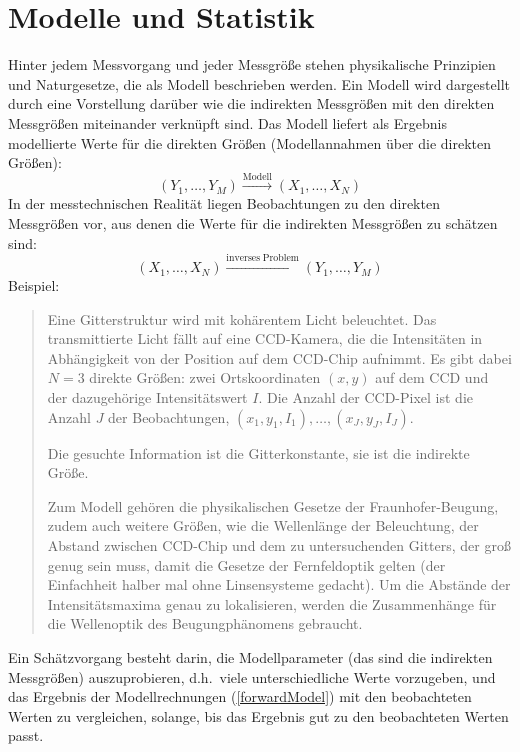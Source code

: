 \documentclass[a4paper,12pt,DIV=15]{scrartcl}
\begin{document}
\section{Modelle und Statistik}
Hinter jedem Messvorgang und jeder Messgröße stehen physikalische Prinzipien und Naturgesetze, die
als Modell beschrieben werden. Ein Modell wird dargestellt durch eine Vorstellung darüber wie die
indirekten Messgrößen mit den direkten Messgrößen miteinander verknüpft sind.
Das Modell liefert als Ergebnis modellierte Werte für die direkten Größen (Modellannahmen über die direkten Größen):
\begin{equation}
(Y_1, \dots, Y_M) \xrightarrow{\mathrm{Modell}} (X_1, \dots, X_N)
\label{forwardModel}
\end{equation}
In der messtechnischen Realität liegen Beobachtungen zu den direkten Messgrößen vor, aus denen die Werte für die
indirekten Messgrößen zu schätzen sind:
\begin{equation}
(X_1, \dots, X_N) \xrightarrow{\mathrm{inverses \; Problem}} (Y_1, \dots, Y_M)
\label{inverseProblem}
\end{equation}
Beispiel:
\begin{quote}
Eine Gitterstruktur wird mit kohärentem Licht beleuchtet. Das transmittierte Licht fällt auf eine CCD-Kamera, die
die Intensitäten in Abhängigkeit von der Position auf dem CCD-Chip aufnimmt. Es gibt dabei $N = 3$ direkte Größen:
zwei Ortskoordinaten $(x, y)$ auf dem CCD und der dazugehörige Intensitätswert $I$. Die Anzahl der CCD-Pixel ist die
Anzahl $J$ der Beobachtungen, $(x_1, y_1, I_1), \dots, (x_J, y_J, I_J)$.

Die gesuchte Information ist die Gitterkonstante, sie ist die indirekte Größe. 

Zum Modell gehören die physikalischen Gesetze der Fraunhofer-Beugung, zudem auch weitere Größen, wie die Wellenlänge
der Beleuchtung, der Abstand zwischen CCD-Chip und dem zu untersuchenden Gitters, der groß genug sein muss, damit die
Gesetze der Fernfeldoptik gelten (der Einfachheit halber mal ohne Linsensysteme gedacht). Um die Abstände der Intensitätsmaxima
genau zu lokalisieren, werden die Zusammenhänge für die Wellenoptik des Beugungphänomens gebraucht.
\end{quote}

Ein Schätzvorgang besteht darin, die Modellparameter (das sind die indirekten Messgrößen) auszuprobieren, d.h.\
viele unterschiedliche Werte vorzugeben, und
das Ergebnis der Modellrechnungen (\ref{forwardModel}) mit den beobachteten Werten zu vergleichen, solange,
bis das Ergebnis \glqq gut zu den beobachteten Werten passt\grqq.
\end{document}
